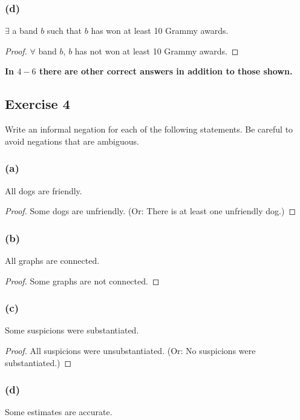 \documentclass[14pt]{extarticle}
\newcommand{\fa}{\forall}
\newcommand{\te}{\exists}
\begin{document}
\subsubsection{(d)}
$\te$ a band $b$ such that $b$ has won at least 10 Grammy awards.

\begin{proof}
    $\fa$ band $b$, $b$ has not won at least 10 Grammy awards.
\end{proof}

{\bf \color{cyan} In $4-6$ there are other correct answers in addition to those shown.}

\subsection{Exercise 4}
Write an informal negation for each of the following statements. Be careful to avoid negations that are ambiguous.

\subsubsection{(a)}
All dogs are friendly.

\begin{proof}
    Some dogs are unfriendly. (Or: There is at least one
    unfriendly dog.)

\end{proof}

\subsubsection{(b)}
All graphs are connected.

\begin{proof}
    Some graphs are not connected.
\end{proof}

\subsubsection{(c)}
Some suspicions were substantiated.

\begin{proof}
    All suspicions were unsubstantiated. (Or: No suspicions were substantiated.)
\end{proof}

\subsubsection{(d)}
Some estimates are accurate.
\end{document}

